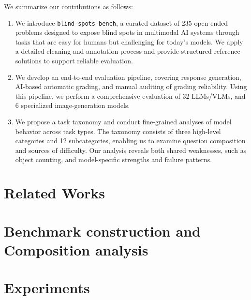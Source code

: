 \documentclass{article}
\newcommand{\bench}{\texttt{blind-spots-bench}\xspace}    %
\begin{document}
We summarize our contributions as follows:
\begin{enumerate}[leftmargin=*]
    \item We introduce \bench, a curated dataset of 235 open-ended problems designed to expose blind spots in multimodal AI systems through tasks that are easy for humans but challenging for today's models. We apply a detailed cleaning and annotation process and provide structured reference solutions to support reliable evaluation.

    \item We develop an end-to-end evaluation pipeline, covering response generation, AI-based automatic grading, and manual auditing of grading reliability. Using this pipeline, we perform a comprehensive evaluation of 32 LLMs/VLMs, and 6 specialized image-generation models.

    \item We propose a task taxonomy and conduct fine-grained analyses of model behavior across task types. The taxonomy consists of three high-level categories and 12 subcategories, enabling us to examine question composition and sources of difficulty. Our analysis reveals both shared weaknesses, such as object counting, and model-specific strengths and failure patterns.
\end{enumerate}

\section{Related Works}



\section{Benchmark construction and Composition analysis}



\section{Experiments}
\end{document}
